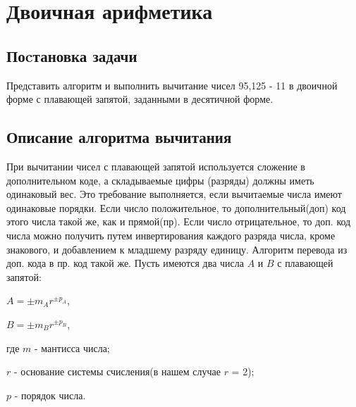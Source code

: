 \section{Двоичная арифметика}

\subsection{Поcтановка задачи}

Представить алгоритм и выполнить вычитание чисел 95,125 - 11 в двоичной форме с плавающей запятой, заданными в десятичной форме.

\subsection{Описание алгоритма вычитания}

При вычитании чисел с плавающей запятой используется сложение в дополнительном коде, а складываемые цифры (разряды) должны иметь одинаковый вес. Это требование выполняется, если вычитаемые числа
имеют одинаковые порядки. Если число положительное, то дополнительный(доп) код этого числа такой же, как и прямой(пр). Если число отрицательное, то доп. код числа можно получить путем инвертирования каждого разряда числа, кроме знакового, и добавлением к младшему разряду единицу. Алгоритм перевода из доп. кода в пр. код такой же. Пусть имеются два числа $A$ и $B$ с плавающей запятой:

$A = \pm m_A r^{\pm p_A}$, 

$B = \pm m_B r^{\pm p_B}$,\begin{explanation}
    \item[где] $m$ - мантисса числа;
    \item $r$ - основание системы счисления(в нашем случае $r$ = 2);
    \item $p$ - порядок числа. 
\end{explanation}

